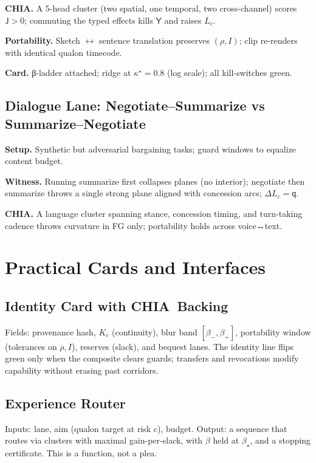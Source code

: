 \documentclass[11pt]{article}
\newcommand{\1}{\mathbf{1}}
\newcommand{\ratio}{\rho}
\newcommand{\rate}{I}
\newcommand{\Blur}{\beta}
\newcommand{\Lc}{L_c}
\newcommand{\Qualon}{\mathsf{q}}        %
\newcommand{\CHIA}{\textsc{CHIA}}
\newcommand{\Yield}{\mathsf{Y}}
\newcommand{\Score}{\mathsf{J}}
\newcommand{\Kc}{K_c}      %
\begin{document}
\textbf{\CHIA.} A 5-head cluster (two spatial, one temporal, two cross-channel) scores $\Score>0$; commuting the typed effects kills $\Yield$ and raises $\Lc$.

\textbf{Portability.} Sketch $\leftrightarrow$ sentence translation preserves $(\ratio,\rate)$; clip re-renders with identical qualon timecode.

\textbf{Card.} β-ladder attached; ridge at $\kappa^\star\!=\!0.8$ (log scale); all kill-switches green.

\subsection{Dialogue Lane: Negotiate–Summarize vs Summarize–Negotiate}
\textbf{Setup.} Synthetic but adversarial bargaining tasks; guard windows to equalize content budget.

\textbf{Witness.} Running summarize first collapses planes (no interior); negotiate then summarize throws a single strong plane aligned with concession arcs; $\Delta\Lc=\Qualon$.

\textbf{\CHIA.} A language cluster spanning stance, concession timing, and turn-taking cadence throws curvature in FG only; portability holds across voice↔text.

\section{Practical Cards and Interfaces}

\subsection{Identity Card with \CHIA\ Backing}
Fields: provenance hash, $\Kc$ (continuity), blur band $[\beta_-,\beta_+]$, portability window (tolerances on $\ratio,\rate$), reserves (slack), and bequest lanes. The identity line flips green only when the composite clears guards; transfers and revocations modify capability without erasing past corridors.

\subsection{Experience Router}
Inputs: lane, aim (qualon target at risk $c$), budget. Output: a sequence that routes via clusters with maximal gain-per-slack, with $\beta$ held at $\Blur_\star$, and a stopping certificate. This is a function, not a plea.
\end{document}
